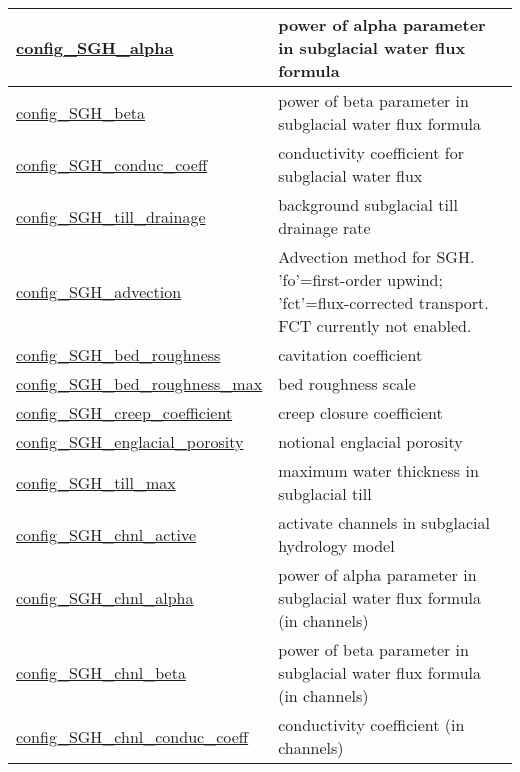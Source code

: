 {\begin{center}
\begin{longtable}{| p{2.0in} || p{4.0in} |}
    \hline
    \hyperref[subsec:nm_sec_config_SGH_alpha]{config\_SGH\_alpha} & power of alpha parameter in subglacial water flux formula \\
    \hline
    \hyperref[subsec:nm_sec_config_SGH_beta]{config\_SGH\_beta} & power of beta parameter in subglacial water flux formula \\
    \hline
    \hyperref[subsec:nm_sec_config_SGH_conduc_coeff]{config\_SGH\_conduc\_coeff} & conductivity coefficient for subglacial water flux \\
    \hline
    \hyperref[subsec:nm_sec_config_SGH_till_drainage]{config\_SGH\_till\_drainage} & background subglacial till drainage rate \\
    \hline
    \hyperref[subsec:nm_sec_config_SGH_advection]{config\_SGH\_advection} & Advection method for SGH. 'fo'=first-order upwind; 'fct'=flux-corrected transport. FCT currently not enabled. \\
    \hline
    \hyperref[subsec:nm_sec_config_SGH_bed_roughness]{config\_SGH\_bed\_roughness} & cavitation coefficient \\
    \hline
    \hyperref[subsec:nm_sec_config_SGH_bed_roughness_max]{config\_SGH\_bed\_roughness\_\-max} & bed roughness scale \\
    \hline
    \hyperref[subsec:nm_sec_config_SGH_creep_coefficient]{config\_SGH\_creep\_coefficient} & creep closure coefficient \\
    \hline
    \hyperref[subsec:nm_sec_config_SGH_englacial_porosity]{config\_SGH\_englacial\_porosity} & notional englacial porosity \\
    \hline
    \hyperref[subsec:nm_sec_config_SGH_till_max]{config\_SGH\_till\_max} & maximum water thickness in subglacial till \\
    \hline
    \hyperref[subsec:nm_sec_config_SGH_chnl_active]{config\_SGH\_chnl\_active} & activate channels in subglacial hydrology model \\
    \hline
    \hyperref[subsec:nm_sec_config_SGH_chnl_alpha]{config\_SGH\_chnl\_alpha} & power of alpha parameter in subglacial water flux formula (in channels) \\
    \hline
    \hyperref[subsec:nm_sec_config_SGH_chnl_beta]{config\_SGH\_chnl\_beta} & power of beta parameter in subglacial water flux formula (in channels) \\
    \hline
    \hyperref[subsec:nm_sec_config_SGH_chnl_conduc_coeff]{config\_SGH\_chnl\_conduc\_coeff} & conductivity coefficient (in channels) \\
    \hline

\end{longtable}
\end{center}}
